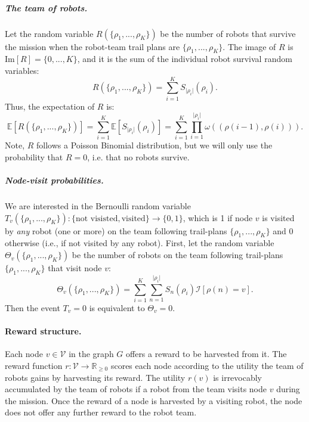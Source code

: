 \documentclass[11pt, oneside]{article}
\begin{document}
\subparagraph{The team of robots.}
Let the random variable $R(\{\rho_1, ..., \rho_K\})$ be the number of robots that survive the mission when the robot-team trail plans are $\{\rho_1, ..., \rho_K\}$. The image of $R$ is $\text{Im}[R] = \{0, ..., K\}$, and it is the sum of the individual robot survival random variables:
\begin{equation}
	R(\{\rho_1, ..., \rho_K\})=\sum_{i=1}^K S_{\lvert \rho_i \rvert}(\rho_i).
\end{equation}
Thus, the expectation of $R$ is:
\begin{equation}
	\mathbb{E}[R(\{\rho_1, ..., \rho_K\})]=\sum_{i=1}^K \mathbb{E}[S_{\lvert \rho_i \rvert}(\rho_i)] = \sum_{i=1}^K  \prod_{i=1}^{\lvert \rho_i\rvert } \omega((\rho(i-1), \rho(i))).
\end{equation}
Note, $R$ follows a Poisson Binomial distribution, but we will only use the probability that $R=0$, i.e. that no robots survive. 

\subparagraph{Node-visit probabilities.}
We are interested in the Bernoulli random variable $T_v(\{ \rho_1, ..., \rho_K \} ):\{ \text{not visisted}, \text{visited} \} \rightarrow \{0, 1\}$, which is 1 if node $v$ is visited by \emph{any} robot (one or more) on the team following trail-plans $\{ \rho_1, ..., \rho_K \}$ and 0 otherwise (i.e., if not visited by any robot).
First, let the random variable $\Theta_v(\{ \rho_1, ..., \rho_K \} )$ be the number of robots on the team following trail-plans $\{ \rho_1, ..., \rho_K \}$ that visit node $v$:
\begin{equation}
	\Theta_v(\{ \rho_1, ..., \rho_K \} )= \sum_{i=1}^K \sum_{n=1}^{\lvert \rho_i \rvert} S_n(\rho_i) \mathcal{I}[\rho(n)=v].
\end{equation}
Then the event $T_v=0$ is equivalent to $\Theta_v=0$.


\paragraph{Reward structure.}
Each node $v\in \mathcal{V}$ in the graph $G$ offers a reward to be harvested from it. 
The reward function $r: \mathcal{V} \rightarrow \mathbb{R}_{\geq 0}$ scores each node according to the utility the team of robots gains by harvesting its reward. The utility $r(v)$ is irrevocably accumulated by the team of robots if a robot from the team visits node $v$ during the mission.
Once the reward of a node is harvested by a visiting robot, the node does not offer any further reward to the robot team.
\end{document}
